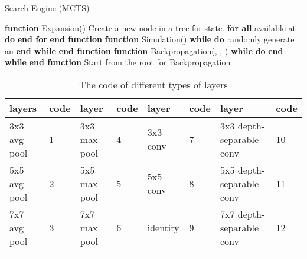 \documentclass[10pt,twocolumn,letterpaper]{article}
\begin{document}
\begin{algorithm}[H]
  \caption{Search Engine (MCTS)}
  \label{MCTS}
    \begin{algorithmic}[1]
    \STATE \textbf{function} {Expansion}()
    \STATE \quad Create a new node in a tree for state.
    \STATE \quad \textbf{for all}  available at  \textbf{do}
    \STATE \quad  
    \STATE \quad \textbf{end for}
    \STATE \textbf{end function}
    \STATE
    \STATE \textbf{function} {Simulation}()
    \STATE 
    \STATE \quad \textbf{while}  \textbf{do}
    \STATE \quad \quad randomly generate an 
    \STATE \quad \quad    {}
    \STATE \quad \textbf{end while}
\STATE \textbf{end function}
    \STATE
    \STATE \textbf{function} {Backpropagation}(, , )
\STATE \quad \textbf{while}  \textbf{do}
    \STATE \quad \quad   
    \STATE \quad \quad 
    \STATE \quad \quad   
    \STATE \quad \textbf{end while} 
    \STATE \textbf{end function}
    \STATE
       Start from the root
      \WHILE {}
      \STATE   \STATE   
      \STATE 
      \WHILE{}
      \STATE 
      \STATE    {}
      \STATE 
      \STATE  for  
      \STATE 
      \STATE 
      \STATE  {}
      \STATE Backpropagation 
      \ENDIF
      \ENDWHILE
      \ENDWHILE
    \end{algorithmic}
\end{algorithm}




\newpage








\begin{table*}[t]
  \small
  \caption{The code of different types of layers}
  \label{app:layers_used}
  \centering
  \begin{tabular}{ l l l l l l l l}
    \toprule
          layers & code & layer & code & layer & code & layer & code \\
    \midrule
    	  3x3 avg pool & 1 & 3x3 max pool & 4 & 3x3 conv & 7 & 3x3 depth-separable conv & 10  \\
    	  5x5 avg pool & 2 & 5x5 max pool & 5 & 5x5 conv & 8 & 5x5 depth-separable conv & 11  \\
    	  7x7 avg pool & 3 & 7x7 max pool & 6 & identity & 9 & 7x7 depth-separable conv & 12  \\
    \bottomrule
    \label{layers_used}
  \end{tabular}
\vspace{-0.3in}
\end{table*}
\end{document}
